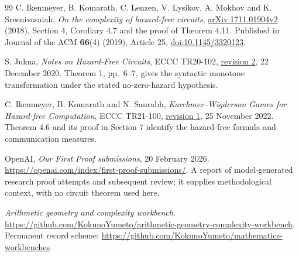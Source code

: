\documentclass[11pt]{article}
\newcommand{\workbenchurl}{https://github.com/KokunoYumeto/arithmetic-geometry-complexity-workbench}
\newcommand{\recordurl}{https://github.com/KokunoYumeto/mathematics-workbenches}
\theoremstyle{definition}
\theoremstyle{remark}
\begin{document}
\begin{thebibliography}{99}
C. Ikenmeyer, B. Komarath, C. Lenzen, V. Lysikov, A. Mokhov and
K. Sreenivasaiah, \emph{On the complexity of hazard-free circuits},
\href{https://arxiv.org/abs/1711.01904v2}{arXiv:1711.01904v2} (2018),
Section 4, Corollary 4.7 and the proof of Theorem 4.11.
Published in Journal of the ACM \textbf{66}(4) (2019), Article 25,
\href{https://doi.org/10.1145/3320123}{doi:10.1145/3320123}.

S. Jukna, \emph{Notes on Hazard-Free Circuits}, ECCC TR20-102,
\href{https://eccc.weizmann.ac.il/report/2020/102/revision/2/download/}{revision 2},
22 December 2020. Theorem 1, pp.~6--7, gives the syntactic monotone
transformation under the stated no-zero-hazard hypothesis.

C. Ikenmeyer, B. Komarath and N. Saurabh,
\emph{Karchmer--Wigderson Games for Hazard-free Computation},
ECCC TR21-100,
\href{https://eccc.weizmann.ac.il/report/2021/100/revision/1/download/}{revision 1},
25 November 2022. Theorem 4.6 and its proof in Section 7 identify the
hazard-free formula and communication measures.

OpenAI, \emph{Our First Proof submissions}, 20 February 2026.
\url{https://openai.com/index/first-proof-submissions/}.
A report of model-generated research proof attempts and subsequent review;
it supplies methodological context, with no circuit theorem used here.

\emph{Arithmetic geometry and complexity workbench}.
\url{\workbenchurl}.
Permanent record scheme: \url{\recordurl}.

\end{thebibliography}
\end{document}

